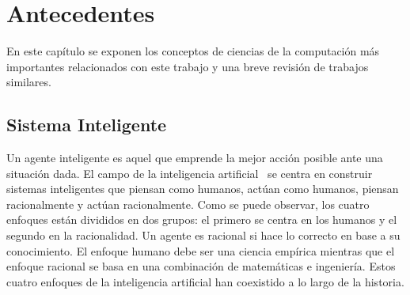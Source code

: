 \chapter{Antecedentes}
\label{cap:Antecedentes}
En este capítulo se exponen los conceptos de ciencias de la computación más importantes relacionados con este trabajo y una breve revisión de trabajos similares.\\

\section{Sistema Inteligente}
Un agente inteligente es aquel que emprende la mejor acción posible ante una situación dada. El campo de la inteligencia artificial~\cite{Russ06} se centra en construir sistemas inteligentes que piensan como humanos, actúan como humanos, piensan racionalmente y actúan racionalmente. Como se puede observar, los cuatro enfoques están divididos en dos grupos: el primero se centra en los humanos y el segundo en la racionalidad. Un agente es racional si hace lo correcto en base a su conocimiento. El enfoque humano debe ser una ciencia empírica mientras que el enfoque racional se basa en una combinación de matemáticas e ingeniería. Estos cuatro enfoques de la inteligencia artificial han coexistido a lo largo de la historia.\\
